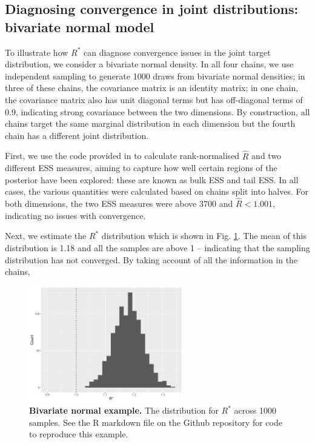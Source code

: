 \documentclass{article}
\begin{document}
\subsection{Diagnosing convergence in joint distributions: bivariate normal model}\label{sec:bivariate_normal}
To illustrate how $R^*$ can diagnose convergence issues in the joint target distribution, we consider a bivariate normal density. In all four chains, we use independent sampling to generate 1000 draws from bivariate normal densities; in three of these chains, the covariance matrix is an identity matrix; in one chain, the covariance matrix also has unit diagonal terms but has off-diagonal terms of 0.9, indicating strong covariance between the two dimensions. By construction, all chains target the same marginal distribution in each dimension but the fourth chain has a different joint distribution.

First, we use the code provided in \cite{vehtari2019rank} to calculate rank-normalised $\hat{R}$ and two different ESS measures, aiming to capture how well certain regions of the posterior have been explored: these are known as bulk ESS and tail ESS. In all cases, the various quantities were calculated based on chains split into halves. For both dimensions, the two ESS measures were above 3700 and $\hat{R}<1.001$, indicating no issues with convergence.

Next, we estimate the $R^*$ distribution which is shown in Fig. \ref{fig:bivariate}. The mean of this distribution is 1.18 and all the samples are above 1 -- indicating that the sampling distribution has not converged. By taking account of all the information in the chains, 

\begin{figure}[h]
	\centerline{\includegraphics[width=0.6\textwidth]{../output/bivariate.pdf}}
	\caption{\textbf{Bivariate normal example.} The distribution for $R^*$ across 1000 samples. See the R markdown file on the Github repository for code to reproduce this example.}
	\label{fig:bivariate}
\end{figure}
\end{document}
